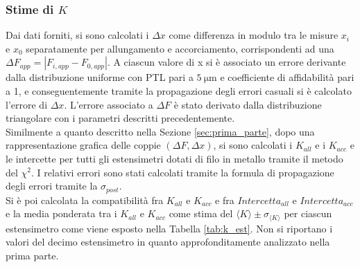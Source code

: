 \documentclass[a4paper,11pt,oneside]{article}
\begin{document}
\subsubsection*{Stime di $K$}
Dai dati forniti, si sono calcolati i $\Delta x$ come differenza in modulo tra le misure $x_i$ e $x_0$ separatamente per allungamento e accorciamento, corrispondenti ad una $\Delta F_{app} =\left | F_{i, app} - F_{0, app} \right |$. A ciascun valore di x si è associato un errore derivante dalla distribuzione uniforme con PTL pari a $\SI{5}{\micro\meter}$ e coefficiente di affidabilità pari a 1, e conseguentemente tramite la propagazione degli errori casuali si è calcolato l'errore di  $\Delta x$. L'errore associato a $\Delta F$ è stato derivato dalla distribuzione triangolare con i parametri descritti precedentemente.\\
Similmente a quanto descritto nella Sezione \ref{sec:prima_parte}, dopo una rappresentazione grafica delle coppie $(\Delta F, \Delta x)$, si sono calcolati i $K_{all}$ e i $K_{acc}$ e le intercette per tutti gli estensimetri dotati di filo in metallo tramite il metodo del $\chi^2$. I relativi errori sono stati calcolati tramite la formula di propagazione degli errori tramite la $\sigma_{post}$.\\
Si è poi calcolata la compatibilità fra $K_{all}$ e $K_{acc}$ e fra $Intercetta_{all}$ e $Intercetta_{acc}$ e la media ponderata tra i $K_{all}$ e $K_{acc}$ come stima del ${\langle K \rangle }\pm \sigma_{{\langle K\rangle }}$ per ciascun estensimetro come viene esposto nella Tabella \ref{tab:k_est}. Non si riportano i valori del decimo estensimetro in quanto approfonditamente analizzato nella prima parte. 

\begin{figure}[H]
    \centering
    \newline
    \newline
    \newline
\end{figure}
\end{document}
